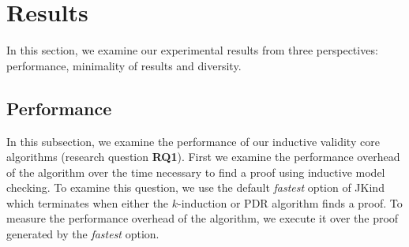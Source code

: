 \section{Results}
\label{sec:results}

\newcommand{\takeaway}[1]{
\vspace{6pt}
\noindent\fbox{\parbox{\columnwidth}{#1}}
\vspace{6pt}
}

In this section, we examine our experimental results from three perspectives: performance, minimality of \ucalg results and diversity.

\subsection{Performance}
\label{sec:performance}

In this subsection, we examine the performance of our inductive validity core algorithms (research question \textbf{RQ1}).  First we examine the performance overhead of the \ucalg algorithm over the time necessary to find a proof using inductive model checking.  To examine this question, we use the default {\em fastest} option of JKind which terminates when either the $k$-induction or PDR algorithm finds a proof.  To measure the performance overhead of the \ucalg algorithm, we execute it over the proof generated by the {\em fastest} option.

